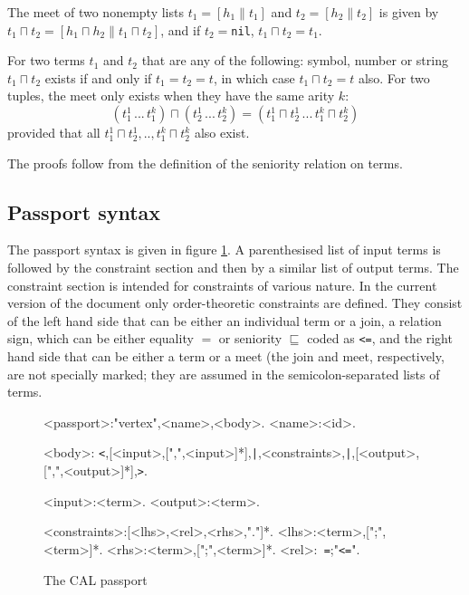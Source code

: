 \documentclass[11pt]{report}
\begin{document}
\begin{prop}
The meet of two nonempty lists  $t_1=[h_1\|t_1]$ and $t_2=[h_2\|t_2]$ is given by  
$t_1\sqcap t_2 =[h_1\sqcap h_2 \| t_1\sqcap t_2]$, and if $t_2=$\verb$nil$, $t_1\sqcap t_2 =t_1$.
\end{prop}

\begin{prop}
For two terms $t_1$ and $t_2$ that are any of the following: symbol, number or string $t_1\sqcap t_2$
exists if and only if $t_1=t_2=t$, in which case $t_1\sqcap t_2 = t$ also. For two tuples, the meet only 
exists when they have the same arity $k$:
\[
(t^1_1\,...\,t^k_1) \sqcap (t^1_2\,...\,t^k_2) = (t^1_1\sqcap t^1_2\,...\,t^k_1\sqcap t^k_2)
\]
provided that all $t^1_1\sqcap t^1_2,..,t^k_1\sqcap t^k_2$ also exist.
\end{prop}
The proofs follow from the definition of the seniority relation on terms.

\subsection{Passport syntax}

The passport syntax is given in figure \ref{pass-syntax}. A parenthesised list of input terms is followed by the constraint section and then by a similar list of output terms. The constraint section is intended for constraints of various nature. In the current version of the document only order-theoretic constraints are defined. They consist of the left hand side that can be either an individual term or a join, a relation sign, which can be either equality $=$ or seniority $\sqsubseteq$ coded as \verb"<=", and the right hand side that can be either a term or a meet (the join and meet, respectively, are not specially marked; they are assumed in the semicolon-separated lists of terms.

\begin{figure}
\begin{framed}
\begin{grammar}
<passport>:"vertex",<name>,<body>.
<name>:<id>.

<body>: \verb"<",[<input>,[",",<input>]*],\verb"|",<constraints>,\verb"|",[<output>,[",",<output>]*],\verb">".

<input>:<term>.
<output>:<term>.

<constraints>:[<lhs>,<rel>,<rhs>,"."]*.
<lhs>:<term>,[";",<term>]*.
<rhs>:<term>,[";",<term>]*.
<rel>:\verb" =";"{\tt <=}".

\end{grammar}
\end{framed}
\caption{The CAL passport\label{pass-syntax}}
\end{figure}
\end{document}

